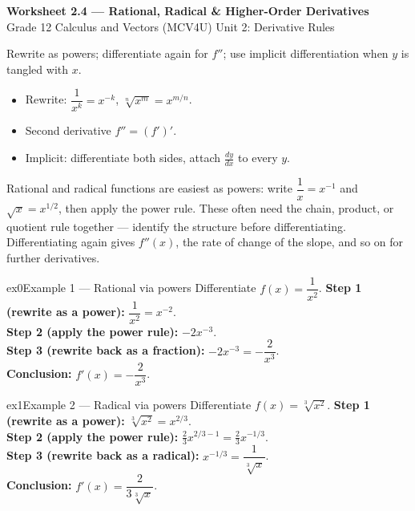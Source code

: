 \documentclass[11pt]{article}
\begin{document}
\begin{center}
{\LARGE\bfseries\color{titleblue}Worksheet 2.4 --- Rational, Radical \& Higher-Order Derivatives}\\[2pt]
{\small Grade 12 Calculus and Vectors (MCV4U) \textperiodcentered{} Unit 2: Derivative Rules}
\end{center}

\begin{ideabox}
Rewrite as powers; differentiate again for $f''$; use implicit differentiation when $y$ is tangled with $x$.
\begin{itemize}[leftmargin=*,itemsep=2pt]
  \item Rewrite: $\dfrac1{x^k}=x^{-k}$, $\sqrt[n]{x^m}=x^{m/n}$.
  \item Second derivative $f''=(f')'$.
  \item Implicit: differentiate both sides, attach $\tfrac{dy}{dx}$ to every $y$.
\end{itemize}
\end{ideabox}

\begin{learnbox}
Rational and radical functions are easiest as powers: write $\dfrac{1}{x}=x^{-1}$ and $\sqrt{x}=x^{1/2}$, then apply the power rule.
These often need the chain, product, or quotient rule together — identify the structure before differentiating.
Differentiating again gives $f''(x)$, the rate of change of the slope, and so on for further derivatives.
\end{learnbox}


\begin{example}{ex0}{Example 1 --- Rational via powers}
Differentiate $f(x)=\dfrac1{x^2}$.\soln
\textbf{Step 1 (rewrite as a power):} $\dfrac1{x^2}=x^{-2}$.\\[3pt]
\textbf{Step 2 (apply the power rule):} $-2x^{-3}$.\\[3pt]
\textbf{Step 3 (rewrite back as a fraction):} $-2x^{-3}=-\dfrac2{x^3}$.\\[3pt]
\textbf{Conclusion:} $f'(x)=-\dfrac2{x^3}$.
\end{example}

\begin{example}{ex1}{Example 2 --- Radical via powers}
Differentiate $f(x)=\sqrt[3]{x^2}$.\soln
\textbf{Step 1 (rewrite as a power):} $\sqrt[3]{x^2}=x^{2/3}$.\\[3pt]
\textbf{Step 2 (apply the power rule):} $\tfrac23x^{2/3-1}=\tfrac23x^{-1/3}$.\\[3pt]
\textbf{Step 3 (rewrite back as a radical):} $x^{-1/3}=\dfrac1{\sqrt[3]{x}}$.\\[3pt]
\textbf{Conclusion:} $f'(x)=\dfrac2{3\sqrt[3]{x}}$.
\end{example}
\end{document}
